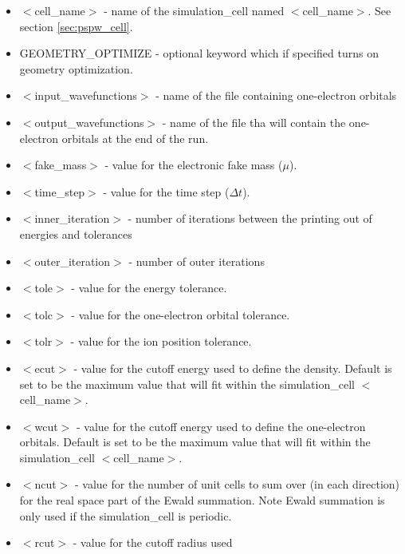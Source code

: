 \begin{itemize}
        \item $<$cell\_name$>$ - name of
              the simulation\_cell named $<$cell\_name$>$. See section \ref{sec:pspw_cell}.
        \item GEOMETRY\_OPTIMIZE - optional keyword which if specified
              turns on geometry optimization.   
        \item $<$input\_wavefunctions$>$ - name of the
              file containing one-electron orbitals
        \item $<$output\_wavefunctions$>$ - name of the
              file tha will contain the one-electron orbitals at the
              end of the run. 
        \item $<$fake\_mass$>$ - value for the electronic
              fake mass ($\mu$).
        \item $<$time\_step$>$ - value for the time step ($\Delta t$).
        \item $<$inner\_iteration$>$ - number of iterations between the 
              printing out of energies and tolerances
        \item $<$outer\_iteration$>$ - number of outer iterations
        \item $<$tole$>$ - value for the energy tolerance.
        \item $<$tolc$>$ - value for the one-electron orbital tolerance.
        \item $<$tolr$>$ - value for the ion position tolerance.
        \item $<$ecut$>$ - value for the cutoff energy used
                           to define the density.  Default is set
                           to be the maximum value that will fit
                           within the simulation\_cell $<$cell\_name$>$.
        \item $<$wcut$>$ - value for the cutoff energy used
                           to define the one-electron orbitals. Default is set
                           to be the maximum value that will fit
                           within the simulation\_cell $<$cell\_name$>$.
        \item $<$ncut$>$ - value for the number of unit cells
                          to sum over (in each direction) for the real space
                          part of the Ewald summation.  Note Ewald summation
                          is only used if the simulation\_cell is periodic.
        \item $<$rcut$>$ - value for the cutoff radius used

\end{itemize}
